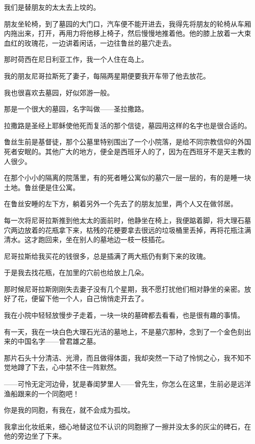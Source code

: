 \par 我们是替朋友的太太去上坟的。
\par 朋友坐轮椅，到了墓园的大门口，汽车便不能开进去，我得先将朋友的轮椅从车厢内拖出来，打开，再用力将他移上椅子，然后慢慢地推着他。他的膝上放着一大束血红的玫瑰花，一边讲着闲话，一边往鲁丝的墓穴走去。
\par 那时荷西在尼日利亚工作，我一个人住在岛上。
\par 我的朋友尼哥拉斯死了妻子，每隔两星期便要我开车带了他去放花。
\par 我也很喜欢去墓园，好似郊游一般。
\par 那是一个很大的墓园，名字叫做——圣拉撒路。
\par 拉撒路是圣经上耶稣使他死而复活的那个信徒，墓园用这样的名字也是很合适的。
\par 鲁丝生前是基督徒，那个公墓里特别围出了一个小院落，是给不同宗教信仰的外国死者安眠的。其他广大的地方，便全是西班牙人的了，因为在西班牙不是天主教的人很少。
\par 在那个小小的隔离的院落里，有的死者睡公寓似的墓穴一层一层的，有的是睡一块土地。鲁丝便是住公寓。
\par 在鲁丝安睡的左下方，躺着另外一个先去了的朋友加里，两个人又在做邻居。
\par 每一次将尼哥拉斯推到他太太的面前时，他静坐在椅上，我便踮着脚，将大理石墓穴两边放着的花瓶拿下来，枯残的花梗要拿去很远的垃圾桶里丢掉，再将花瓶注满清水。这才跑回来，坐在别人的墓地边一枝一枝插花。
\par 尼哥拉斯给我买花的钱很多，总是插满了两大瓶仍有剩下来的玫瑰。
\par 于是我去找花瓶，在加里的穴前也给放上几朵。
\par 那时候尼哥拉斯刚刚失去妻子没有几个星期，我不愿打扰他们相对静坐的亲密。放好了花，便留下他一个人，自己悄悄走开去了。
\par 我在小院中轻轻放慢步子走着，一块一块的墓碑都去看看，也是很有趣的事情。
\par 有一天，我在一块白色大理石光洁的墓地上，不是墓穴那种，念到了一个金色刻出来的中国名字——曾君雄之墓。
\par 那片石头十分清洁、光滑，而且做得体面，我却突然一下动了怜悯之心，我不知不觉地蹲了下去，心中禁不住一阵默然。
\par ——可怜无定河边骨，犹是春闺梦里人——曾先生，你怎么在这里，生前必是远洋渔船跟来的一个同胞吧！
\par 你是我的同胞，有我在，就不会成为孤坟。
\par 我拿出化妆纸来，细心地替这位不认识的同胞擦了一擦并没太多的灰尘的碑石，在他的旁边坐了下来。
